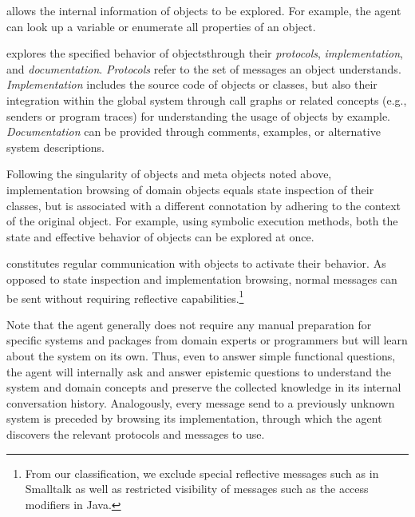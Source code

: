 \begin{description}[noextralabelsep]
	\item[State inspection] allows the internal information of objects to be explored.
	For example, the agent can look up a variable or enumerate all properties of an object.
	\item[Implementation browsing] explores the specified behavior of objects\linebreak{}through their \emph{protocols}, \emph{implementation}, and \emph{documentation}.
	\emph{Protocols} refer to the set of messages an object understands.
	\emph{Implementation} includes the source code of objects or classes, but also their integration within the global system through call graphs or related concepts (e.g., senders or program traces) for understanding the usage of objects by example.
	\emph{Documentation} can be provided through comments, examples, or alternative system descriptions.

	Following the singularity of objects and meta objects noted above, implementation browsing of domain objects equals state inspection of their classes, but is associated with a different connotation by adhering to the context of the original object.
	For example, using symbolic execution methods, both the state and effective behavior of objects can be explored at once.
	\item[Message sending] constitutes regular communication with objects to activate their behavior.
	As opposed to state inspection and implementation browsing, normal messages can be sent without requiring reflective capabilities.\footnote{From our classification, we exclude special reflective messages such as  in Smalltalk as well as restricted visibility of messages such as the  access modifiers in Java.}
\end{description}

Note that the agent generally does not require any manual preparation for specific systems and packages from domain experts or programmers but will learn about the system on its own.
Thus, even to answer simple functional questions, the agent will internally ask and answer epistemic questions to understand the system and domain concepts and preserve the collected knowledge in its internal conversation history.
Analogously, every message send to a previously unknown system is preceded by browsing its implementation, through which the agent discovers the relevant protocols and messages to use.

